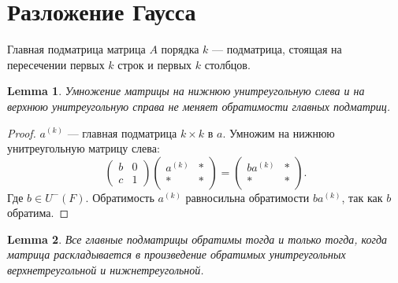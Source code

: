 \documentclass[11pt]{book}
\theoremstyle{definition}
\theoremstyle{plain}
\theoremstyle{plain}
\newtheorem{lm}{Lemma}
\theoremstyle{definition}
\theoremstyle{remark}
\begin{document}
\section{Разложение Гаусса}
\begin{defn}
    {\sf Главная подматрица} матрица $ A$ порядка  $ k$ --- подматрица, стоящая на пересечении первых $ k$ строк и первых $ k$ столбцов.
\end{defn}
\begin{lm}
    Умножение матрицы на нижнюю унитреугольную слева и на верхнюю унитреугольную справа не меняет обратимости главных подматриц.
\end{lm}
\begin{proof}
    $a^{(k)}$ --- главная подматрица $k \times k$ в $a$.
    Умножим на нижнюю унитреугольную матрицу слева:
    \[
	\left (
	    \begin{array}{cc}
		b&0\\
		c&1
	    \end{array}
	\right )
	\left (
	    \begin{array}{cc}
		a^{(k)}&* \\
		*& *
	    \end{array}
	\right )=
	\left (
	    \begin{array}{cc}
		ba^{(k)}&*\\
		*&*
	    \end{array}
	\right )
    .\]
    $\mbox{Где } b \in  U^-(F)$.
    Обратимость $a^{(k)} $ равносильна обратимости $ba^{(k)}$, так как $b$ обратима.
\end{proof}
\begin{lm}
    Все главные подматрицы обратимы тогда и только тогда, когда матрица раскладывается в произведение обратимых унитреугольных верхнетреугольной и нижнетреугольной.
\end{lm}
\end{document}
